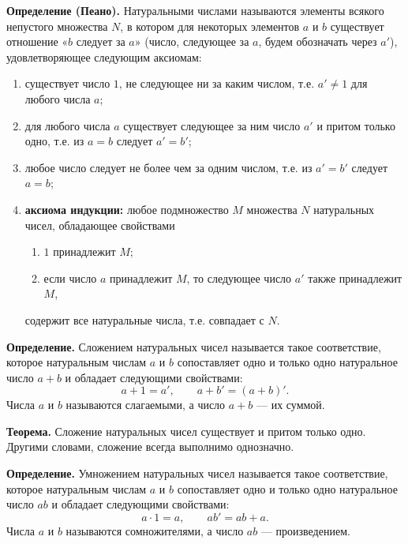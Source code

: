 \begin{rusblock}
\textbf{Определение (Пеано).} Натуральными числами называются элементы всякого непустого множества $N$, в котором для некоторых элементов $a$ и $b$ существует отношение «$b$ следует за $a$» (число, следующее за $a$, будем обозначать через $a'$), удовлетворяющее следующим аксиомам:
\begin{enumerate}[leftmargin=2.2em]
\item существует число $1$, не следующее ни за каким числом, т.е. $a'\ne1$ для любого числа $a$;
\item для любого числа $a$ существует следующее за ним число $a'$ и притом только одно, т.е. из $a=b$ следует $a'=b'$;
\item любое число следует не более чем за одним числом, т.е. из $a'=b'$ следует $a=b$;
\item \textbf{аксиома индукции:} любое подмножество $M$ множества $N$ натуральных чисел, обладающее свойствами
  \begin{enumerate}[label=\Alph*),leftmargin=2em]
  \item $1$ принадлежит $M$;
  \item если число $a$ принадлежит $M$, то следующее число $a'$ также принадлежит $M$,
  \end{enumerate}
содержит все натуральные числа, т.е. совпадает с $N$.
\end{enumerate}
\end{rusblock}

\begin{rusblock}
\textbf{Определение.} Сложением натуральных чисел называется такое соответствие, которое натуральным числам $a$ и $b$ сопоставляет одно и только одно натуральное число $a+b$ и обладает следующими свойствами:
\[
a+1=a',\qquad a+b'=(a+b)'.
\]
Числа $a$ и $b$ называются слагаемыми, а число $a+b$ --- их суммой.

\textbf{Теорема.} Сложение натуральных чисел существует и притом только одно. Другими словами, сложение всегда выполнимо однозначно.

\textbf{Определение.} Умножением натуральных чисел называется такое соответствие, которое натуральным числам $a$ и $b$ сопоставляет одно и только одно натуральное число $ab$ и обладает следующими свойствами:
\[
a\cdot1=a,\qquad ab'=ab+a.
\]
Числа $a$ и $b$ называются сомножителями, а число $ab$ --- произведением.
\end{rusblock}

